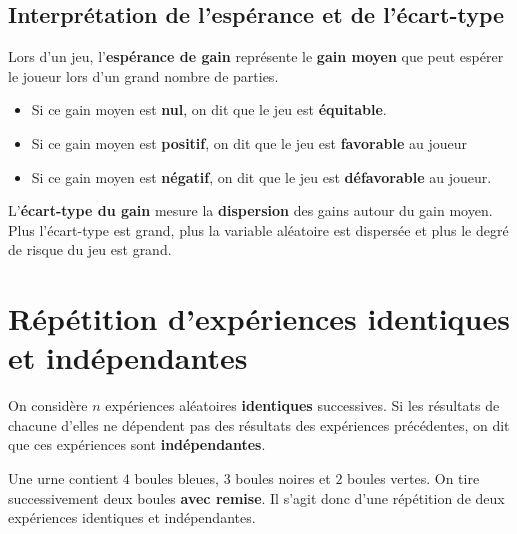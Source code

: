 \documentclass[a4paper,11pt,cours]{nsi} %
\begin{document}
\subsection*{Interprétation de l'espérance et de l'écart-type}
Lors d'un jeu, l'\textbf{espérance de gain} représente le \textbf{gain moyen} que peut espérer le joueur lors d'un grand nombre de parties.
\begin{itemize}
	\item 	Si ce gain moyen est \textbf{nul}, on dit que le jeu est \textbf{équitable}.
	\item 	Si ce gain moyen est \textbf{positif}, on dit que le jeu est \textbf{favorable} au joueur
	\item 	Si ce gain moyen est \textbf{négatif}, on dit que le jeu est \textbf{défavorable} au joueur.
\end{itemize}
L'\textbf{écart-type du gain} mesure la \textbf{dispersion} des gains autour du gain moyen.\\
Plus l'écart-type est grand, plus la variable aléatoire est dispersée et plus le degré de risque du jeu est grand.

\section{Répétition d'expériences identiques et indépendantes}

\begin{definition}
	On considère $n$ expériences aléatoires \textbf{identiques} successives. Si les résultats de chacune d'elles ne dépendent pas des résultats 
	des expériences précédentes, on dit que ces expériences sont \textbf{indépendantes}.
\end{definition}

\begin{exemple}[]
	Une urne contient $4$ boules bleues, $3$ boules noires et $2$ boules vertes. 
	On tire successivement deux boules \textbf{avec remise}. Il s'agit donc d'une répétition de deux expériences identiques et indépendantes.
\end{exemple}
\end{document}

